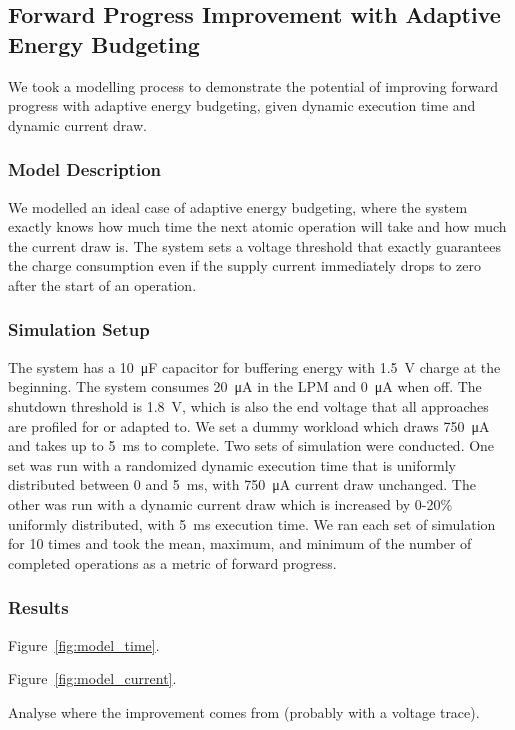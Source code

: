 








\subsection{Forward Progress Improvement with Adaptive Energy Budgeting}

We took a modelling process to demonstrate the potential of improving forward progress with adaptive energy budgeting, given dynamic execution time and dynamic current draw.

\subsubsection{Model Description}
We modelled an ideal case of adaptive energy budgeting, where the system exactly knows how much time the next atomic operation will take and how much the current draw is. The system sets a voltage threshold that exactly guarantees the charge consumption even if the supply current immediately drops to zero after the start of an operation. 

\subsubsection{Simulation Setup}
The system has a \SI{10}{\micro\farad} capacitor for buffering energy with \SI{1.5}{\volt} charge at the beginning. 
The system consumes \SI{20}{\micro\ampere} in the LPM and \SI{0}{\micro\ampere} when off.
The shutdown threshold is \SI{1.8}{\volt}, which is also the end voltage that all approaches are profiled for or adapted to. 
We set a dummy workload which draws \SI{750}{\micro\ampere} and takes up to \SI{5}{\milli\second} to complete.
Two sets of simulation were conducted.
One set was run with a randomized dynamic execution time that is uniformly distributed between 0 and \SI{5}{\milli\second}, with \SI{750}{\micro\ampere} current draw unchanged. The other was run with a dynamic current draw which is increased by 0-20\% uniformly distributed, with \SI{5}{\milli\second} execution time. 
We ran each set of simulation for 10 times and took the mean, maximum, and minimum of the number of completed operations as a metric of forward progress. 

\subsubsection{Results}

Figure~\ref{fig:model_time}.



Figure~\ref{fig:model_current}.
  

Analyse where the improvement comes from (probably with a voltage trace).